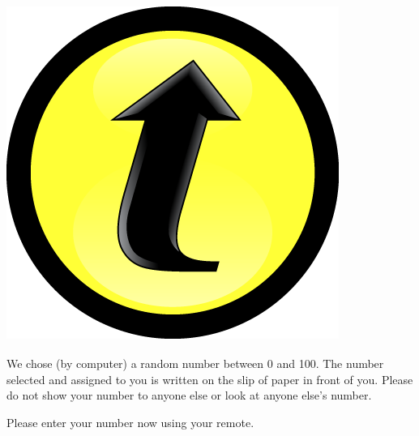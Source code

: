 \documentclass[handout]{beamer}
\begin{document}
\begin{frame}

\frametitle{\includegraphics[scale = 0.05]{./images/clicker}}

We chose (by computer) a random number between 0 and 100. The number selected and assigned to you is written on the slip of paper in front of you. Please do not show your number to anyone else or look at anyone else's number.

\vspace{1em}

Please enter your number now using your remote.

\end{frame}

\end{document}
